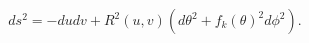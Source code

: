 \begin{equation}\label{roberts}
    ds^2=-dudv + R^2(u,v) (d\theta^2+f_k(\theta)^2 d\phi^2) .
\end{equation}

